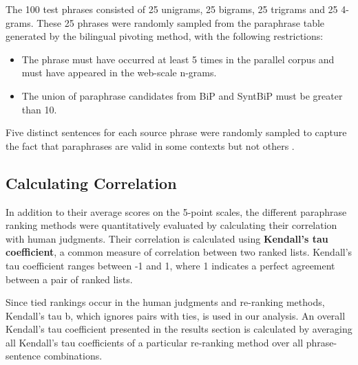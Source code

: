 \documentclass[11pt]{article}
\begin{document}
The 100 test phrases consisted of 25 unigrams, 25 bigrams, 25 trigrams and 25 4-grams.  These  25 phrases were randomly sampled from the paraphrase table generated by the bilingual pivoting method, with the following restrictions: 

\begin{itemize}
\item The phrase must have occurred at least 5 times in the parallel corpus and must have appeared in the web-scale n-grams.
\item The union of paraphrase candidates from BiP and SyntBiP must be greater than 10.
\end{itemize}

Five distinct sentences for each source phrase were randomly sampled to capture the fact that paraphrases are valid in some contexts but not others \cite{Szpektor2007}. 


\subsection{Calculating Correlation}
In addition to their average scores on the 5-point scales, the different paraphrase ranking methods were quantitatively evaluated by calculating their correlation with human judgments.  
Their correlation is calculated using {\bf Kendall's tau coefficient}, a common measure of correlation between two ranked lists. Kendall's tau coefficient ranges between -1 and 1, where 1 indicates a perfect agreement between a pair of ranked lists. 

Since tied rankings occur in the human judgments and re-ranking methods, Kendall's tau b, which ignores pairs with ties, is used in our analysis. An overall Kendall's tau coefficient presented in the results section is calculated by averaging all Kendall's tau coefficients of a particular re-ranking method over all phrase-sentence combinations. 

\end{document}
